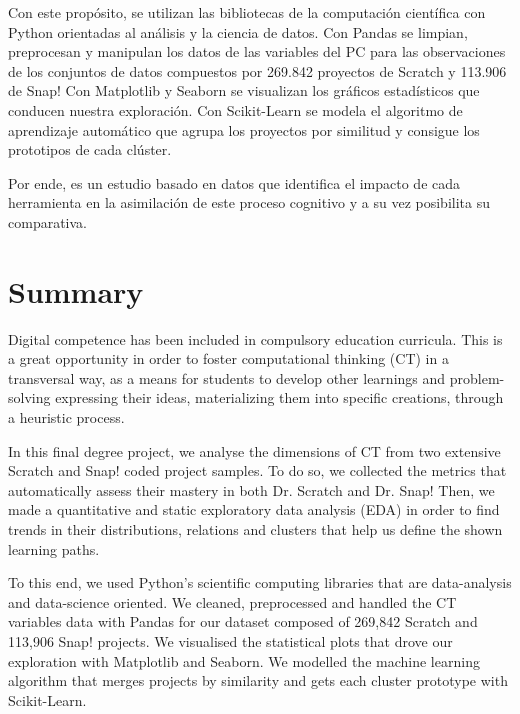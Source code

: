 \documentclass[a4paper, 12pt]{book}
\begin{document}
Con este propósito, se utilizan las bibliotecas de la computación científica con Python orientadas al análisis y la ciencia de datos. Con Pandas se limpian, preprocesan y manipulan los datos de las variables del PC para las observaciones de los conjuntos de datos compuestos por 269.842 proyectos de Scratch y 113.906 de Snap! Con Matplotlib y Seaborn se visualizan los gráficos estadísticos que conducen nuestra exploración. Con Scikit-Learn se modela el algoritmo de aprendizaje automático que agrupa los proyectos por similitud y consigue los prototipos de cada clúster.

Por ende, es un estudio basado en datos que identifica el impacto de cada herramienta en la asimilación de este proceso cognitivo y a su vez posibilita su comparativa.



\chapter*{Summary}

Digital competence has been included in compulsory education curricula. This is a great opportunity in order to foster computational thinking (CT) in a transversal way, as a means for students to develop other learnings and problem-solving expressing their ideas, materializing them into specific creations, through a heuristic process.

In this final degree project, we analyse the dimensions of CT from two extensive Scratch and Snap! coded project samples. To do so, we collected the metrics that automatically assess their mastery in both Dr. Scratch and Dr. Snap! Then, we made a quantitative and static exploratory data analysis (EDA) in order to find trends in their distributions, relations and clusters that help us define the shown learning paths.

To this end, we used Python's scientific computing libraries that are data-analysis and data-science oriented. We cleaned, preprocessed and handled the CT variables data with Pandas for our dataset composed of 269,842 Scratch and 113,906 Snap! projects. We visualised the statistical plots that drove our exploration with Matplotlib and Seaborn.
We modelled the machine learning algorithm that merges projects by similarity and gets each cluster prototype with Scikit-Learn.
\end{document}
